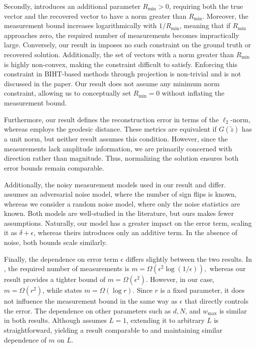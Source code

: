 \documentclass[journal]{IEEEtran}
\begin{document}
Secondly,  introduces an additional parameter $R_{\min} > 0$, requiring both the true vector and the recovered vector to have a norm greater than $R_{\min}$. Moreover, the measurement bound increases logarithmically with $1/R_{\min}$, meaning that if $R_{\min}$ approaches zero, the required number of measurements becomes impractically large. Conversely, our result in  imposes no such constraint on the ground truth or recovered solution. Additionally, the set of vectors with a norm greater than $R_{\min}$ is highly non-convex, making the constraint difficult to satisfy. Enforcing this constraint in BIHT-based methods through projection is non-trivial and is not discussed in the paper. Our result does not assume any minimum norm constraint, allowing us to conceptually set $R_{\min} = 0$ without inflating the measurement bound.  

Furthermore, our result defines the reconstruction error in terms of the $\ell_2$-norm, whereas  employs the geodesic distance. These metrics are equivalent if $G(\tilde{z})$ has a unit norm, but neither result assumes this condition. However, since the measurements lack amplitude information, we are primarily concerned with direction rather than magnitude. Thus, normalizing the solution ensures both error bounds remain comparable.  

Additionally, the noisy measurement models used in our result and  differ.  assumes an adversarial noise model, where the number of sign flips is known, whereas we consider a random noise model, where only the noise statistics are known. Both models are well-studied in the literature, but ours makes fewer assumptions. Naturally, our model has a greater impact on the error term, scaling it as $\delta + \epsilon$, whereas theirs introduces only an additive term. In the absence of noise, both bounds scale similarly.  

Finally, the dependence on error term $\epsilon$ differs slightly between the two results. In , the required number of measurements is  
$m = \Omega(\epsilon^2 \log(1/\epsilon)),$  
whereas our result provides a tighter bound of $m = \Omega(\epsilon^2)$. However, in our case, $m = \Omega(r^2)$, while  states $m = \Omega(\log r)$. Since $r$ is a fixed parameter, it does not influence the measurement bound in the same way as $\epsilon$ that directly controls the error. The dependence on other parameters such as $d,N$, and $w_{\max}$ is similar in both results. Although  assumes $L = 1$, extending it to arbitrary $L$ is straightforward, yielding a result comparable to  and maintaining similar dependence of $m$ on $L$.  
\end{document}
